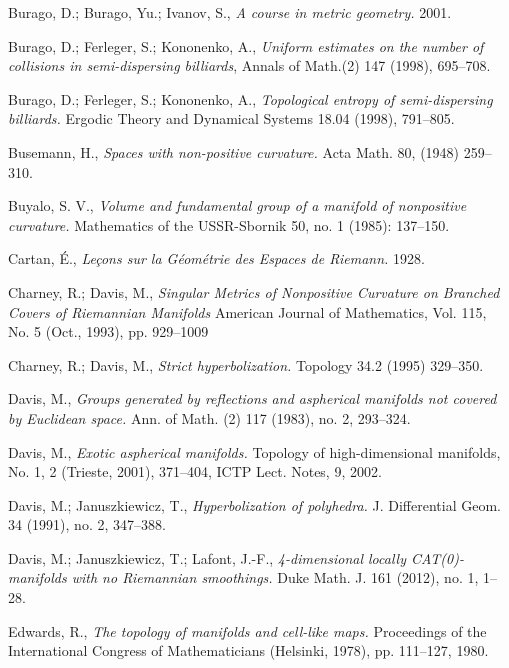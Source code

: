 \begin{thebibliography}{52}
Burago, D.; 
Burago, Yu.; 
Ivanov, S., 
\textit{A course in metric geometry.} 2001. 

Burago, D.; 
Ferleger, S.; 
Kononenko, A.,
\textit{Uniform estimates on the number of collisions in semi-dispersing billiards},
Annals of Math.(2) 147 (1998), 695--708.

Burago, D.; 
Ferleger, S.;
Kononenko, A., 
\textit{Topological entropy of semi-dispersing billiards.} 
Ergodic Theory and Dynamical Systems 
18.04 
(1998), 
791--805.

Busemann, H., 
\textit{Spaces with non-positive curvature.} 
Acta Math. 
80, 
(1948) 
259--310.

Buyalo, S. V.,
\textit{Volume and fundamental group of a manifold of nonpositive curvature.}
Mathematics of the USSR-Sbornik 50, no. 1 (1985): 137--150.

Cartan, \'E.,
\textit{Le\c{c}ons sur la G\'eom\'etrie des Espaces de Riemann.} 1928.

Charney, R.;
Davis, M.,
\textit{Singular Metrics of Nonpositive Curvature on Branched Covers of Riemannian Manifolds}
American Journal of Mathematics, 
Vol. 115, 
No. 5 
(Oct., 1993), 
pp. 929--1009

Charney, R.; Davis, M., 
\textit{Strict hyperbolization.} 
Topology 
34.2 
(1995) 
329--350.

Davis, M., 
\textit{Groups generated by reflections and aspherical manifolds not covered by Euclidean space.}
Ann. of Math. 
(2) 117 
(1983), 
no. 2, 
293--324. 

Davis, M.,
\textit{Exotic aspherical manifolds.} 
Topology of high-dimensional manifolds, 
No. 1, 2 (Trieste, 2001), 371--404, ICTP Lect. Notes, 9, 2002.



Davis, M.; 
Januszkiewicz, T., 
\textit{Hyperbolization of polyhedra.} 
J. Differential Geom. 
34 
(1991), 
no. 2, 
347--388.

Davis, M.; 
Januszkiewicz, T.; 
Lafont, J.-F.,
\textit{4-dimensional locally CAT(0)-manifolds with no Riemannian smoothings.} 
Duke Math. J. 
161 
(2012), 
no. 1, 
1--28.

Edwards, R.,
\textit{The topology of manifolds and cell-like maps.} Proceedings of the International Congress of Mathematicians (Helsinki, 1978), pp. 111--127, 1980.


\end{thebibliography}
